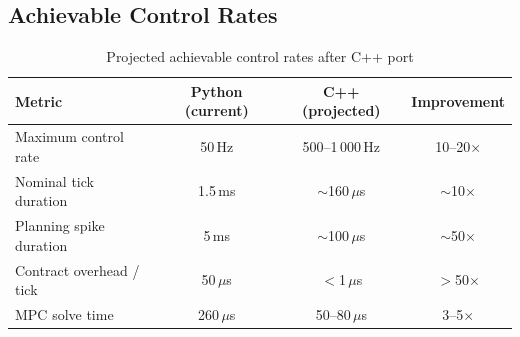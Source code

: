 \subsection{Achievable Control Rates}

\begin{table}[htbp]
    \centering
    \caption{Projected achievable control rates after C++ port}
    \label{tab:cpp_rates}
    \begin{tabular}{@{}lccc@{}}
        \toprule
        \textbf{Metric} & \textbf{Python (current)} & \textbf{C++ (projected)} & \textbf{Improvement} \\
        \midrule
        Maximum control rate & 50\,Hz & 500--1\,000\,Hz & 10--20$\times$ \\
        Nominal tick duration & 1.5\,ms & $\sim$160\,$\mu$s & $\sim$10$\times$ \\
        Planning spike duration & 5\,ms & $\sim$100\,$\mu$s & $\sim$50$\times$ \\
        Contract overhead / tick & 50\,$\mu$s & $<$1\,$\mu$s & $>$50$\times$ \\
        MPC solve time & 260\,$\mu$s & 50--80\,$\mu$s & 3--5$\times$ \\
        \bottomrule
    \end{tabular}
\end{table}

